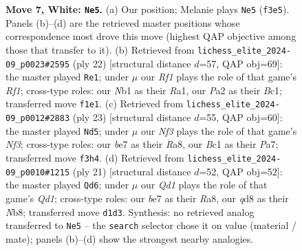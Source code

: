 \documentclass[11pt]{article}
\begin{document}
\begin{figure}[p]
\caption{\textbf{Move 7, White: \texttt{Ne5}.} (a) Our position; Melanie plays \texttt{Ne5} (\texttt{f3e5}). Panels (b)--(d) are the retrieved master positions whose correspondence most drove this move (highest QAP objective among those that transfer to it). (b) Retrieved from \texttt{lichess\_elite\_2024-09\_p0023\#2595} (ply 22) [structural distance $d$=57, QAP obj=69]: the master played \texttt{Re1}; under $\mu$ our \emph{Rf1} plays the role of that game's \emph{Rf1}; cross-type roles: our \emph{N}b1 as their \emph{R}a1, our \emph{P}a2 as their \emph{B}c1; transferred move \texttt{f1e1}. (c) Retrieved from \texttt{lichess\_elite\_2024-09\_p0012\#2883} (ply 23) [structural distance $d$=55, QAP obj=60]: the master played \texttt{Nd5}; under $\mu$ our \emph{Nf3} plays the role of that game's \emph{Nf3}; cross-type roles: our \emph{b}e7 as their \emph{R}a8, our \emph{B}c1 as their \emph{P}a7; transferred move \texttt{f3h4}. (d) Retrieved from \texttt{lichess\_elite\_2024-09\_p0010\#1215} (ply 21) [structural distance $d$=52, QAP obj=52]: the master played \texttt{Qd6}; under $\mu$ our \emph{Qd1} plays the role of that game's \emph{Qd1}; cross-type roles: our \emph{b}e7 as their \emph{R}a8, our \emph{q}d8 as their \emph{N}b8; transferred move \texttt{d1d3}. Synthesis: no retrieved analog transferred to \texttt{Ne5} -- the \texttt{search} selector chose it on value (material / mate); panels (b)--(d) show the strongest nearby analogies.}
\label{fig:thought-m12}
\end{figure}

\clearpage
\end{document}
